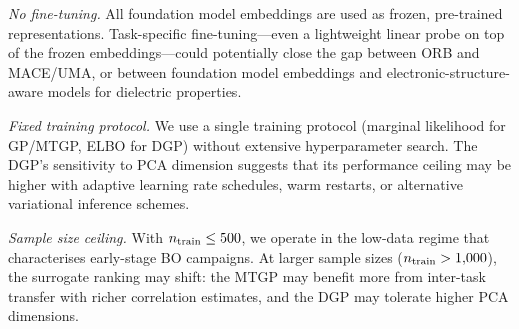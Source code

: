 \emph{No fine-tuning.}
All foundation model embeddings are used as frozen, pre-trained representations.
Task-specific fine-tuning---even a lightweight linear probe on top of the frozen embeddings---could potentially close the gap between ORB and MACE/UMA, or between foundation model embeddings and electronic-structure-aware models for dielectric properties.

\emph{Fixed training protocol.}
We use a single training protocol (marginal likelihood for GP/MTGP, ELBO for DGP) without extensive hyperparameter search.
The DGP's sensitivity to PCA dimension suggests that its performance ceiling may be higher with adaptive learning rate schedules, warm restarts, or alternative variational inference schemes.

\emph{Sample size ceiling.}
With $n_{\text{train}} \leq 500$, we operate in the low-data regime that characterises early-stage BO campaigns.
At larger sample sizes ($n_{\text{train}} > 1{,}000$), the surrogate ranking may shift: the MTGP may benefit more from inter-task transfer with richer correlation estimates, and the DGP may tolerate higher PCA dimensions.
